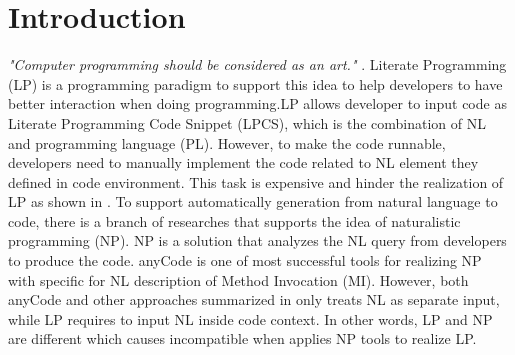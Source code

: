 \documentclass[sigconf,review]{acmart}
\begin{document}



\maketitle

\section{Introduction}
\textit{"Computer programming should be considered as an art."} \cite{001}. Literate Programming (LP) is a programming paradigm to support this idea to help developers to have better interaction when doing programming.LP allows developer to input code as Literate Programming Code Snippet (LPCS), which is the combination of NL and programming language (PL). However, to make the code runnable, developers need to manually implement the code related to NL element they defined in code environment. This task is expensive and hinder the realization of LP as shown in \cite{004}. To support automatically generation from natural language to code, there is a branch of researches that supports the idea of naturalistic programming (NP). NP \cite{025} is a solution that analyzes the NL query from developers to produce the code. anyCode \cite{007} is one of most successful tools for realizing NP with specific for NL description of Method Invocation (MI). However, both anyCode and other approaches summarized in \cite{025} only treats NL as separate input, while LP requires to input NL inside code context. In other words, LP and NP are different which causes incompatible when applies NP tools to realize LP.
\end{document}
